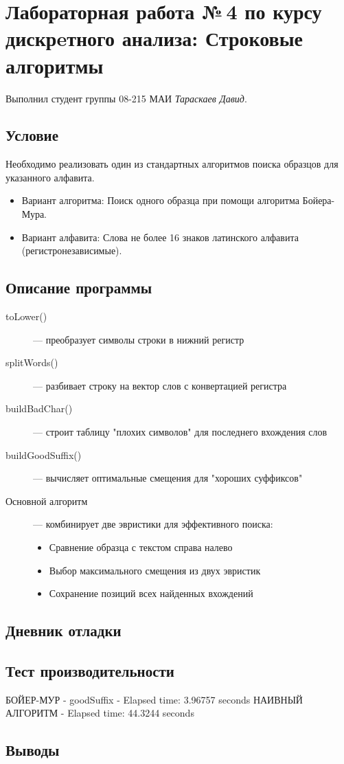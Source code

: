 \documentclass[12pt]{article}
\begin{document}
\section*{Лабораторная работа №\,4 по курсу дискрeтного анализа: Строковые алгоритмы}

Выполнил студент группы 08-215 МАИ \textit{Тараскаев Давид}.

\subsection*{Условие}

Необходимо реализовать один из стандартных алгоритмов поиска образцов для указанного алфавита.

\begin{itemize}
    \item Вариант алгоритма: Поиск одного образца при помощи алгоритма Бойера-Мура.
    \item Вариант алфавита: Слова не более 16 знаков латинского алфавита (регистронезависимые).
\end{itemize}

\subsection*{Описание программы}

\begin{description}
\item[{toLower()}] --- преобразует символы строки в нижний регистр
\item[{splitWords()}] --- разбивает строку на вектор слов с конвертацией регистра
\item[{buildBadChar()}] --- строит таблицу "плохих символов" для последнего вхождения слов
\item[{buildGoodSuffix()}] --- вычисляет оптимальные смещения для "хороших суффиксов"
\item[Основной алгоритм] --- комбинирует две эвристики для эффективного поиска:
\begin{itemize}
    \item Сравнение образца с текстом справа налево
    \item Выбор максимального смещения из двух эвристик
    \item Сохранение позиций всех найденных вхождений
\end{itemize}
\end{description}

\subsection*{Дневник отладки}


\subsection*{Тест производительности}

БОЙЕР-МУР - goodSuffix - Elapsed time: 3.96757 seconds
НАИВНЫЙ АЛГОРИТМ - Elapsed time: 44.3244 seconds

\subsection*{Выводы}
\end{document}
